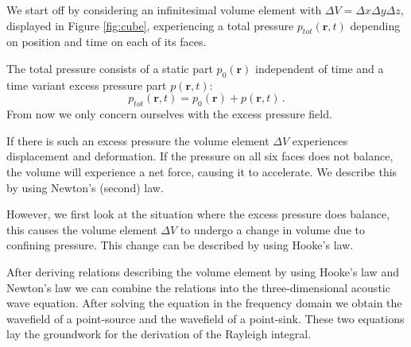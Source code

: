 We start off by considering an infinitesimal volume element with $\Delta V = \Delta x \Delta y \Delta z$, displayed in Figure \ref{fig:cube}, experiencing a total pressure $p_{tot}(\mathbf r, t)$ depending on position and time on each of its faces.

The total pressure consists of a static part $p_0(\mathbf r)$ independent of time and a time variant excess pressure part $p(\mathbf r, t)$:
\begin{equation}
    p_{tot}(\mathbf r, t) = p_0(\mathbf r) + p(\mathbf r, t) \,.\nonumber
\end{equation}
From now we only concern ourselves with the excess pressure field.

If there is such an excess pressure the volume element $\Delta V$ experiences displacement and deformation.
If the pressure on all six faces does not balance, the volume will experience a net force, causing it to accelerate.
We describe this by using Newton's (second) law.

However, we first look at the situation where the excess pressure does balance, this causes the volume element $\Delta V$ to undergo a change in volume due to confining pressure.
This change can be described by using Hooke's law.

After deriving relations describing the volume element by using Hooke's law and Newton's law we can combine the relations into the three-dimensional acoustic wave equation.
After solving the equation in the frequency domain we obtain the wavefield of a point-source and the wavefield of a point-sink.
These two equations lay the groundwork for the derivation of the Rayleigh integral.


